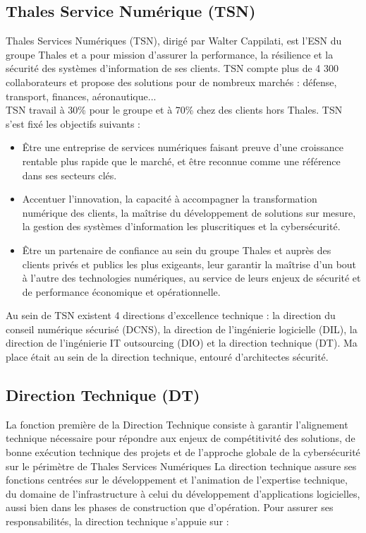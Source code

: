 \documentclass[a4paper, 12pt]{article}
\begin{document}
\subsection{Thales Service Numérique (TSN)}

Thales Services Numériques (TSN), dirigé par Walter Cappilati, est l’ESN du groupe Thales et a pour mission d’assurer la performance, la résilience et la sécurité des systèmes d’information de ses clients. TSN compte plus de 4 300 collaborateurs et propose des solutions pour de nombreux marchés : défense, transport, finances, aéronautique... \\ 

TSN travail à 30\% pour le groupe et à 70\% chez des clients hors Thales. TSN s’est fixé les objectifs suivants :
\begin{itemize}
	\item Être une entreprise de services numériques faisant preuve d’une croissance rentable plus rapide que le marché, et être reconnue comme une référence dans ses secteurs clés.
	\item Accentuer l’innovation, la capacité à accompagner la transformation numérique des clients, la maîtrise du développement de solutions sur mesure, la gestion des systèmes d’information les pluscritiques et la cybersécurité.
	\item Être un partenaire de confiance au sein du groupe Thales et auprès des clients privés et publics les plus exigeants, leur garantir la maîtrise d’un bout à l’autre des technologies numériques, au service de leurs enjeux de sécurité et de performance économique et opérationnelle. \\
\end{itemize}

Au sein de TSN existent 4 directions d’excellence technique : la direction du conseil numérique sécurisé (DCNS), la direction de l’ingénierie logicielle (DIL), la direction de l’ingénierie IT outsourcing (DIO) et la direction technique (DT). Ma place était au sein de la direction technique, entouré d’architectes sécurité.

\subsection{Direction Technique (DT)}

La fonction première de la Direction Technique consiste à garantir l’alignement technique nécessaire pour répondre aux enjeux de compétitivité des solutions, de bonne exécution technique des projets et de l’approche globale de la cybersécurité sur le périmètre de Thales Services Numériques La direction technique assure ses fonctions centrées sur le développement et l’animation de l’expertise technique, du domaine de l’infrastructure à celui du développement d’applications logicielles, aussi bien dans les phases de construction que d’opération. Pour assurer ses responsabilités, la direction technique s’appuie sur :
\end{document}

